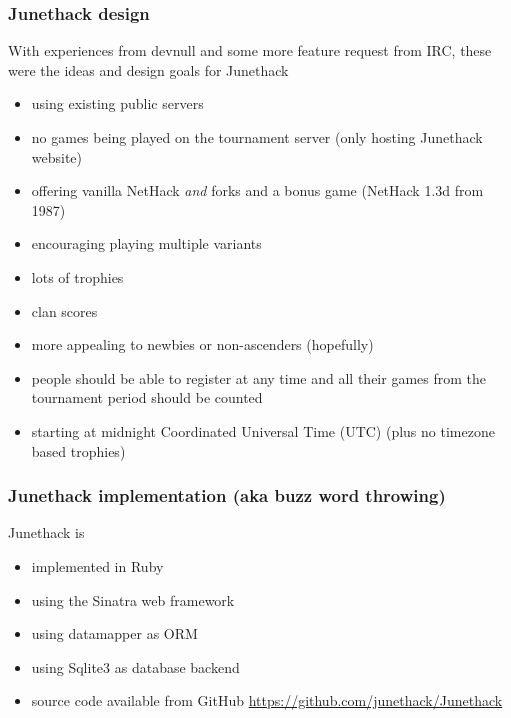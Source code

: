 \documentclass{beamer}
\begin{document}
\begin{frame}
\frametitle{Junethack design}
  With experiences from devnull and some more feature request from IRC, these were the ideas and design goals for Junethack\pause
  \begin{itemize}[<+->]
    \item using existing public servers
    \item no games being played on the tournament server (only hosting Junethack website)
    \item offering vanilla NetHack \textit{and} forks and a bonus game (NetHack 1.3d from 1987)
    \item encouraging playing multiple variants
    \item lots of trophies
    \item clan scores
    \item more appealing to newbies or non-ascenders (hopefully)
    \item people should be able to register at any time and all their games from the tournament period should be counted
    \item starting at midnight Coordinated Universal Time (UTC) (plus no timezone based trophies)
  \end{itemize}
\end{frame}

\frametitle{Junethack implementation (aka buzz word throwing)}
\begin{frame}
  Junethack is\pause
  \begin{itemize}[<+->]
    \item implemented in Ruby
    \item using the Sinatra web framework
    \item using datamapper as ORM
    \item using Sqlite3 as database backend
    \item source code available from GitHub \url{https://github.com/junethack/Junethack}
  \end{itemize}
\end{frame}
\end{document}
